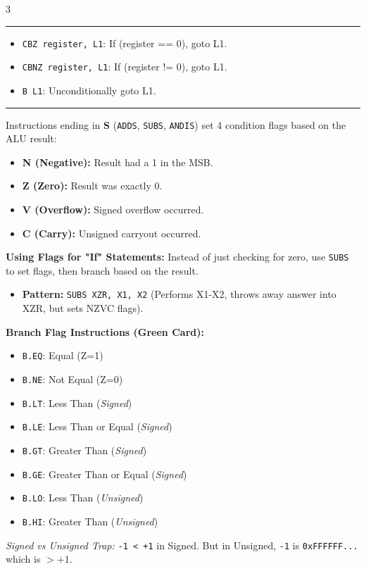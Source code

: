 \documentclass[6pt, letterpaper]{article}
\newcommand{\sectionhead}[1]{%
    \vspace{1mm}{\large\bfseries#1}\vspace{0.2mm}\hrule\vspace{0.8mm}%
}
\begin{document}
\begin{multicols}{3}
\sectionhead{Base Conditional Branches}
\begin{itemize}
    \item \texttt{CBZ register, L1}: If (register == 0), goto L1.
    \item \texttt{CBNZ register, L1}: If (register != 0), goto L1.
    \item \texttt{B L1}: Unconditionally goto L1.
\end{itemize}

\sectionhead{Condition Codes (Flags)}
Instructions ending in \textbf{S} (\texttt{ADDS}, \texttt{SUBS}, \texttt{ANDIS}) set 4 condition flags based on the ALU result:
\begin{itemize}
    \item \textbf{N (Negative):} Result had a 1 in the MSB.
    \item \textbf{Z (Zero):} Result was exactly 0.
    \item \textbf{V (Overflow):} Signed overflow occurred.
    \item \textbf{C (Carry):} Unsigned carryout occurred.
\end{itemize}

\columnbreak

\textbf{Using Flags for "If" Statements:}
Instead of just checking for zero, use \texttt{SUBS} to set flags, then branch based on the result.
\begin{itemize}
    \item \textbf{Pattern:} \texttt{SUBS XZR, X1, X2} (Performs X1-X2, throws away answer into XZR, but sets NZVC flags).
\end{itemize}

\textbf{Branch Flag Instructions (Green Card):}
\begin{itemize}
    \item \texttt{B.EQ}: Equal (Z=1)
    \item \texttt{B.NE}: Not Equal (Z=0)
    \item \texttt{B.LT}: Less Than (\textit{Signed})
    \item \texttt{B.LE}: Less Than or Equal (\textit{Signed})
    \item \texttt{B.GT}: Greater Than (\textit{Signed})
    \item \texttt{B.GE}: Greater Than or Equal (\textit{Signed})
    \item \texttt{B.LO}: Less Than (\textit{Unsigned})
    \item \texttt{B.HI}: Greater Than (\textit{Unsigned})
\end{itemize}
\textit{Signed vs Unsigned Trap:} \texttt{-1 < +1} in Signed. But in Unsigned, \texttt{-1} is \texttt{0xFFFFFF...} which is $> +1$.


\end{multicols}
\end{document}
